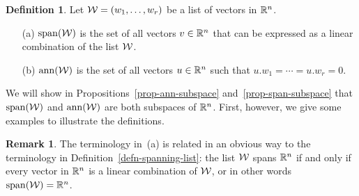 \documentclass[reqno]{amsart}
\theoremstyle{definition}
\newtheorem{remark}[theorem]{Remark}
\newtheorem{definition}[theorem]{Definition}
\begin{document}
\begin{definition}\label{defn-span-ann}
 Let $\mathcal{W}=(w_1,\dotsc,w_r)$ be a list of vectors in ${\mathbb{R}}^n$.
 \begin{itemize}
  \item[(a)] $\operatorname{span}(\mathcal{W})$ is the set of all vectors $v\in{\mathbb{R}}^n$ that can
   be expressed as a linear combination of the list $\mathcal{W}$.
  \item[(b)] $\operatorname{ann}(\mathcal{W})$ is the set of all vectors $u\in{\mathbb{R}}^n$ such
   that $u.w_1=\dotsb=u.w_r=0$.
 \end{itemize}
\end{definition}

We will show in Propositions~\ref{prop-ann-subspace}
and~\ref{prop-span-subspace} that $\operatorname{span}(\mathcal{W})$ and $\operatorname{ann}(\mathcal{W})$ are both
subspaces of ${\mathbb{R}}^n$.  First, however, we give some examples to
illustrate the definitions.

\begin{remark}\label{rem-span-span}
 The terminology in~(a) is related in an obvious way to the
 terminology in Definition~\ref{defn-spanning-list}: the list $\mathcal{W}$
 spans ${\mathbb{R}}^n$ if and only if every vector in ${\mathbb{R}}^n$ is a linear
 combination of $\mathcal{W}$, or in other words $\operatorname{span}(\mathcal{W})={\mathbb{R}}^n$.
\end{remark}
\end{document}
